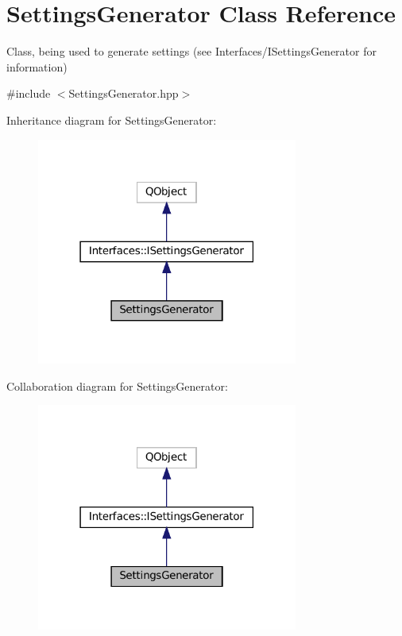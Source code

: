 \hypertarget{class_settings_generator}{}\section{Settings\+Generator Class Reference}
\label{class_settings_generator}


Class, being used to generate settings (see Interfaces/\+I\+Settings\+Generator for information)  




{\ttfamily \#include $<$Settings\+Generator.\+hpp$>$}



Inheritance diagram for Settings\+Generator\+:\nopagebreak
\begin{figure}[H]
\begin{center}
\leavevmode
\includegraphics[width=243pt]{class_settings_generator__inherit__graph}
\end{center}
\end{figure}


Collaboration diagram for Settings\+Generator\+:\nopagebreak
\begin{figure}[H]
\begin{center}
\leavevmode
\includegraphics[width=243pt]{class_settings_generator__coll__graph}
\end{center}
\end{figure}
